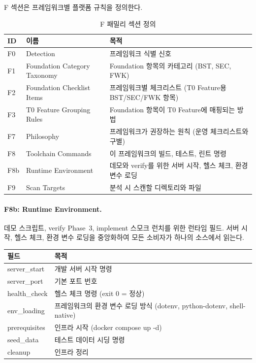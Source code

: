 \documentclass[11pt,a4paper,openright,twoside]{report}
\begin{document}
F 섹션은 프레임워크별 플랫폼 규칙을 정의한다.

\begin{table}[H]
\centering
\caption{F 패밀리 섹션 정의}
\label{tab:f-sections}
\begin{tabularx}{\textwidth}{llX}
\toprule
\textbf{ID} & \textbf{이름} & \textbf{목적} \\
\midrule
F0 & Detection & 프레임워크 식별 신호 \\
F1 & Foundation Category Taxonomy & Foundation 항목의 카테고리 (BST, SEC, FWK) \\
F2 & Foundation Checklist Items & 프레임워크별 체크리스트 (T0 Feature용 BST/SEC/FWK 항목) \\
F3 & T0 Feature Grouping Rules & Foundation 항목이 T0 Feature에 매핑되는 방법 \\
F7 & Philosophy & 프레임워크가 권장하는 원칙 (운영 체크리스트와 구별) \\
F8 & Toolchain Commands & 이 프레임워크의 빌드, 테스트, 린트 명령 \\
F8b & Runtime Environment & 데모와 verify를 위한 서버 시작, 헬스 체크, 환경 변수 로딩 \\
F9 & Scan Targets & 분석 시 스캔할 디렉토리와 파일 \\
\bottomrule
\end{tabularx}
\end{table}

\paragraph{F8b: Runtime Environment.}
데모 스크립트, verify Phase~3, implement 스모크 런치를 위한 런타임 필드. 서버 시작, 헬스 체크, 환경 변수 로딩을 중앙화하여 모든 소비자가 하나의 소스에서 읽는다.

\begin{table}[H]
\centering
\begin{tabularx}{\textwidth}{lX}
\toprule
\textbf{필드} & \textbf{목적} \\
\midrule
server\_start & 개발 서버 시작 명령 \\
server\_port & 기본 포트 번호 \\
health\_check & 헬스 체크 명령 (exit 0 = 정상) \\
env\_loading & 프레임워크의 환경 변수 로딩 방식 (dotenv, python-dotenv, shell-native) \\
prerequisites & 인프라 시작 (docker compose up -d) \\
seed\_data & 테스트 데이터 시딩 명령 \\
cleanup & 인프라 정리 \\
\bottomrule
\end{tabularx}
\end{table}
\end{document}

